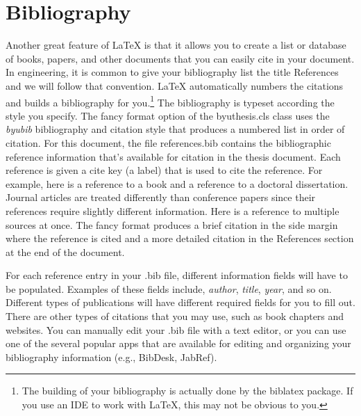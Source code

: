 \section{Bibliography}
Another great feature of \LaTeX{} is that it allows you to create a list or database of books, papers, and other documents that you can easily cite in your document. In engineering, it is common to give your bibliography list the title References and we will follow that convention. \LaTeX{} automatically numbers the citations and builds a bibliography for you.\footnote{The building of your bibliography is actually done by the {\ttfamily biblatex} package. If you use an IDE to work with \LaTeX, this may not be obvious to you.} The bibliography is typeset according the style you specify. The fancy format option of the {\ttfamily byuthesis.cls} class\cite{bugref1} uses the {\em byubib} bibliography and citation style that produces a numbered list in order of citation. For this document, the file {\ttfamily references.bib} contains the bibliographic reference information that's available for citation in the thesis document. Each reference is given a cite key (a label) that is used to cite the reference. For example, here is a reference to a book and a reference to a doctoral dissertation. Journal articles are treated differently than conference papers since their references require slightly different information. Here is a reference to multiple sources at once. The fancy format produces a brief citation in the side margin where the reference is cited and a more detailed citation in the References section at the end of the document.

For each reference entry in your {\ttfamily .bib} file, different information fields will have to be populated. Examples of these fields include, {\em author}, {\em title}, {\em year}, and so on. Different types of publications will have different required fields for you to fill out. There are other types of citations that you may use, such as book chapters and websites. You can manually edit your {\ttfamily .bib} file with a text editor, or you can use one of the several popular apps that are available for editing and organizing your bibliography information (e.g., BibDesk, JabRef).

